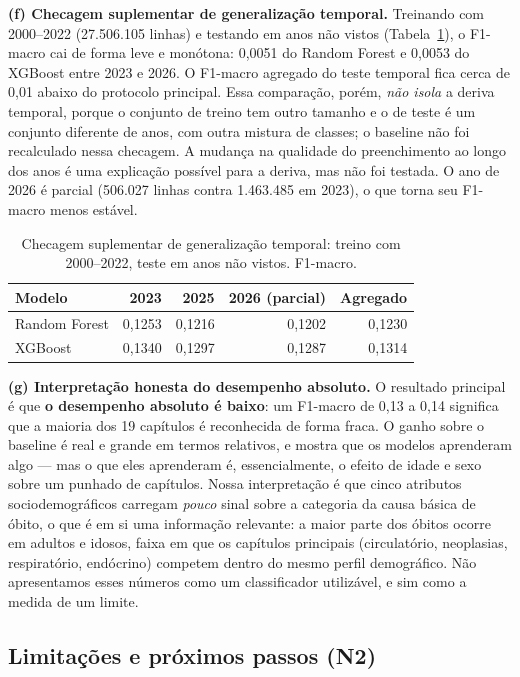 \documentclass[12pt]{article}
\begin{document}
\textbf{(f) Checagem suplementar de generalização temporal.} Treinando com
2000--2022 (27.506.105 linhas) e testando em anos não vistos
(Tabela~\ref{tab:temporal}), o F1-macro cai de forma leve e monótona: 0,0051
do Random Forest e 0,0053 do XGBoost entre 2023 e 2026. O F1-macro agregado do
teste temporal fica cerca de 0,01 abaixo do protocolo principal. Essa
comparação, porém, \emph{não isola} a deriva temporal, porque o conjunto de
treino tem outro tamanho e o de teste é um conjunto diferente de anos, com
outra mistura de classes; o baseline não foi recalculado nessa checagem. A
mudança na qualidade do preenchimento ao longo dos anos é uma explicação
possível para a deriva, mas não foi testada. O ano de 2026 é parcial (506.027
linhas contra 1.463.485 em 2023), o que torna seu F1-macro menos estável.

\begin{table}[ht]
\centering
\caption{Checagem suplementar de generalização temporal: treino com 2000--2022,
  teste em anos não vistos. F1-macro.}
\label{tab:temporal}
\begin{tabular}{|l|r|r|r|r|}
\hline
\textbf{Modelo} & \textbf{2023} & \textbf{2025} & \textbf{2026 (parcial)}
  & \textbf{Agregado} \\
\hline
Random Forest & 0,1253 & 0,1216 & 0,1202 & 0,1230 \\
XGBoost       & 0,1340 & 0,1297 & 0,1287 & 0,1314 \\
\hline
\end{tabular}
\end{table}

\textbf{(g) Interpretação honesta do desempenho absoluto.} O resultado
principal é que \textbf{o desempenho absoluto é baixo}: um F1-macro de 0,13 a
0,14 significa que a maioria dos 19 capítulos é reconhecida de forma fraca. O
ganho sobre o baseline é real e grande em termos relativos, e mostra que os
modelos aprenderam algo --- mas o que eles aprenderam é, essencialmente, o
efeito de idade e sexo sobre um punhado de capítulos. Nossa interpretação é
que cinco atributos sociodemográficos carregam \emph{pouco} sinal sobre a
categoria da causa básica de óbito, o que é em si uma informação relevante: a
maior parte dos óbitos ocorre em adultos e idosos, faixa em que os capítulos
principais (circulatório, neoplasias, respiratório, endócrino) competem dentro
do mesmo perfil demográfico. Não apresentamos esses números como um
classificador utilizável, e sim como a medida de um limite.

\subsection{Limitações e próximos passos (N2)}
\end{document}
